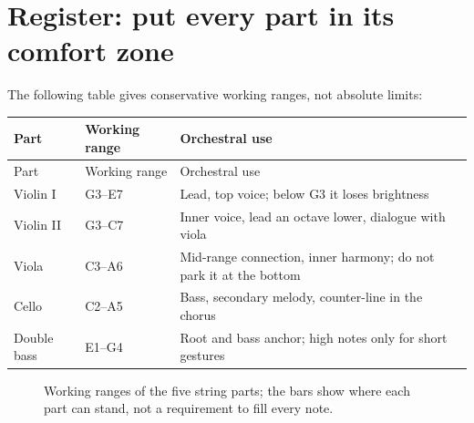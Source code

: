 \section{Register: put every part in its comfort zone}
\label{sec:string-ranges}

The following table gives conservative working ranges, not absolute limits:

\begin{longtable}{p{}p{}p{}}
\toprule
Part & Working range & Orchestral use \\
\midrule
\endfirsthead
\toprule
Part & Working range & Orchestral use \\
\midrule
\endhead
Violin I & G3--E7 & Lead, top voice; below G3 it loses brightness \\
Violin II & G3--C7 & Inner voice, lead an octave lower, dialogue with viola \\
Viola & C3--A6 & Mid-range connection, inner harmony; do not park it at the bottom \\
Cello & C2--A5 & Bass, secondary melody, counter-line in the chorus \\
Double bass & E1--G4 & Root and bass anchor; high notes only for short gestures \\
\bottomrule
\end{longtable}

\begin{figure}[htbp]
  \centering
  \caption{Working ranges of the five string parts; the bars show where each part can stand, not a requirement to fill every note.}
  \label{fig:string-ranges}
\end{figure}

